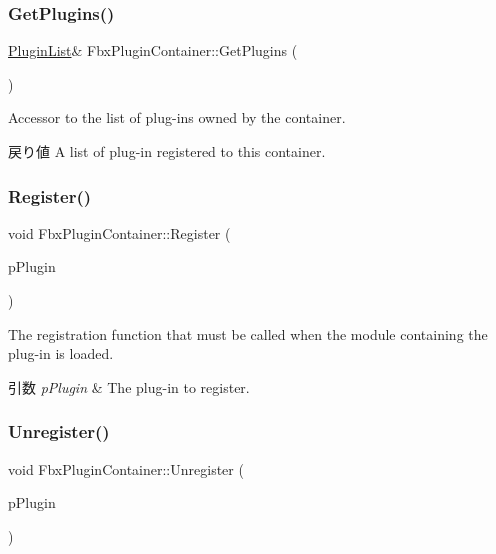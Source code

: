 \subsubsection{\texorpdfstring{Get\+Plugins()}{GetPlugins()}\hspace{0.1cm}{\footnotesize\ttfamily [2/2]}}
{\footnotesize\ttfamily \hyperlink{class_fbx_plugin_container_a42abd8471efa91f56de2c4c64c220972}{Plugin\+List}\& Fbx\+Plugin\+Container\+::\+Get\+Plugins (\begin{DoxyParamCaption}{ }\end{DoxyParamCaption})}

Accessor to the list of plug-\/ins owned by the container. \begin{DoxyReturn}{戻り値}
A list of plug-\/in registered to this container. 
\end{DoxyReturn}
\mbox{\label{class_fbx_plugin_container_a3fc28ffe0296973afb3014112b4b0df0}} 
\subsubsection{\texorpdfstring{Register()}{Register()}}
{\footnotesize\ttfamily void Fbx\+Plugin\+Container\+::\+Register (\begin{DoxyParamCaption}\item[{\hyperlink{class_fbx_plugin}{Fbx\+Plugin} \&}]{p\+Plugin }\end{DoxyParamCaption})}

The registration function that must be called when the module containing the plug-\/in is loaded. 
\begin{DoxyParams}{引数}
{\em p\+Plugin} & The plug-\/in to register. \\
\hline
\end{DoxyParams}
\mbox{\label{class_fbx_plugin_container_af4b2068d41d0e87e97135e9effea55f7}} 
\subsubsection{\texorpdfstring{Unregister()}{Unregister()}}
{\footnotesize\ttfamily void Fbx\+Plugin\+Container\+::\+Unregister (\begin{DoxyParamCaption}\item[{\hyperlink{class_fbx_plugin}{Fbx\+Plugin} \&}]{p\+Plugin }\end{DoxyParamCaption})}

